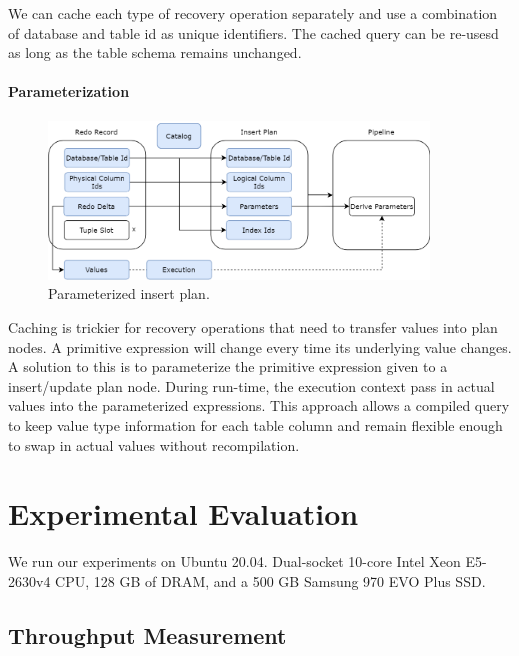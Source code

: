 \documentclass[12pt]{cmuthesis}
\begin{document}
We can cache each type of recovery operation separately and use a combination of database and table id as unique identifiers. The cached query can be re-usesd as long as the table schema remains unchanged.

\subsubsection{Parameterization}
\begin{figure}[H]
\centering
\includegraphics[width=0.9\textwidth]{images/ParameterizedRedoRecord.png}
\caption{Parameterized insert plan.}
\label{fig:parameterization}
\end{figure}

Caching is trickier for recovery operations that need to transfer values into plan nodes. A primitive expression will change every time its underlying value changes. A solution to this is to parameterize the primitive expression given to a insert/update plan node. During run-time, the execution context pass in actual values into the parameterized expressions. This approach allows a compiled query to keep value type information for each table column and remain flexible enough to swap in actual values without recompilation.

\chapter{Experimental Evaluation}
We run our experiments on Ubuntu 20.04.
Dual-socket 10-core Intel Xeon E5-2630v4 CPU, 128 GB of DRAM, and a 500 GB Samsung 970 EVO Plus SSD.

\section{Throughput Measurement}
\end{document}
